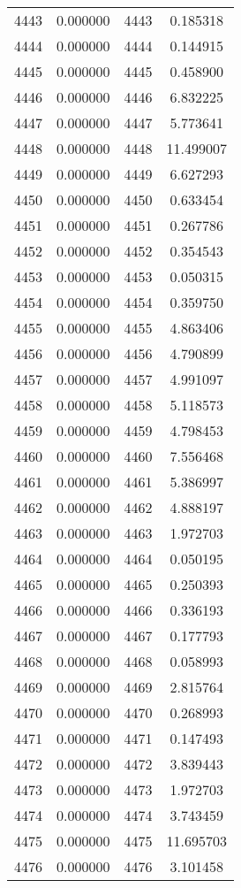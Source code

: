 \documentclass[12pt]{article}
\begin{document}
\begin{longtable}{@{}cccc@{}}
4443 & 0.000000 & 4443 & 0.185318 \\
4444 & 0.000000 & 4444 & 0.144915 \\
4445 & 0.000000 & 4445 & 0.458900 \\
4446 & 0.000000 & 4446 & 6.832225 \\
4447 & 0.000000 & 4447 & 5.773641 \\
4448 & 0.000000 & 4448 & 11.499007 \\
4449 & 0.000000 & 4449 & 6.627293 \\
4450 & 0.000000 & 4450 & 0.633454 \\
4451 & 0.000000 & 4451 & 0.267786 \\
4452 & 0.000000 & 4452 & 0.354543 \\
4453 & 0.000000 & 4453 & 0.050315 \\
4454 & 0.000000 & 4454 & 0.359750 \\
4455 & 0.000000 & 4455 & 4.863406 \\
4456 & 0.000000 & 4456 & 4.790899 \\
4457 & 0.000000 & 4457 & 4.991097 \\
4458 & 0.000000 & 4458 & 5.118573 \\
4459 & 0.000000 & 4459 & 4.798453 \\
4460 & 0.000000 & 4460 & 7.556468 \\
4461 & 0.000000 & 4461 & 5.386997 \\
4462 & 0.000000 & 4462 & 4.888197 \\
4463 & 0.000000 & 4463 & 1.972703 \\
4464 & 0.000000 & 4464 & 0.050195 \\
4465 & 0.000000 & 4465 & 0.250393 \\
4466 & 0.000000 & 4466 & 0.336193 \\
4467 & 0.000000 & 4467 & 0.177793 \\
4468 & 0.000000 & 4468 & 0.058993 \\
4469 & 0.000000 & 4469 & 2.815764 \\
4470 & 0.000000 & 4470 & 0.268993 \\
4471 & 0.000000 & 4471 & 0.147493 \\
4472 & 0.000000 & 4472 & 3.839443 \\
4473 & 0.000000 & 4473 & 1.972703 \\
4474 & 0.000000 & 4474 & 3.743459 \\
4475 & 0.000000 & 4475 & 11.695703 \\
4476 & 0.000000 & 4476 & 3.101458 \\

\end{longtable}
\end{document}
